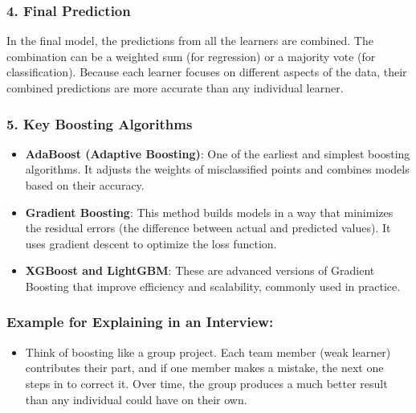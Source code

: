 \documentclass[12pt]{book}
\providecommand{\tightlist}{%
  \setlength{\itemsep}{0pt}\setlength{\parskip}{0pt}}
\begin{document}
\subsubsection{\texorpdfstring{4. \textbf{Final
Prediction}}{4. Final Prediction}}\label{final-prediction}

In the final model, the predictions from all the learners are combined.
The combination can be a weighted sum (for regression) or a majority
vote (for classification). Because each learner focuses on different
aspects of the data, their combined predictions are more accurate than
any individual learner.

\subsubsection{\texorpdfstring{5. \textbf{Key Boosting
Algorithms}}{5. Key Boosting Algorithms}}\label{key-boosting-algorithms}

\begin{itemize}
\tightlist
\item
  \textbf{AdaBoost (Adaptive Boosting)}: One of the earliest and
  simplest boosting algorithms. It adjusts the weights of misclassified
  points and combines models based on their accuracy.
\item
  \textbf{Gradient Boosting}: This method builds models in a way that
  minimizes the residual errors (the difference between actual and
  predicted values). It uses gradient descent to optimize the loss
  function.
\item
  \textbf{XGBoost and LightGBM}: These are advanced versions of Gradient
  Boosting that improve efficiency and scalability, commonly used in
  practice.
\end{itemize}

\subsubsection{Example for Explaining in an
Interview:}\label{example-for-explaining-in-an-interview}

\begin{itemize}
\tightlist
\item
  Think of boosting like a group project. Each team member (weak
  learner) contributes their part, and if one member makes a mistake,
  the next one steps in to correct it. Over time, the group produces a
  much better result than any individual could have on their own.
\end{itemize}
\end{document}
